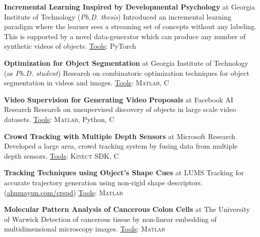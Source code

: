 \documentclass[10pt,twoside,a4paper]{article}
\newif\ifdetail
\newcommand\CPP{C\nolinebreak[4]\hspace{-.05em}\raisebox{.4ex}{\relsize{-3}{\textbf{++}}}}
\begin{document}
\textbf{Incremental Learning Inspired by Developmental Psychology} at Georgia Institute of Technology (\textit{Ph.D. thesis}) \newline
Introduced an incremental learning paradigm where the learner sees a streaming set of concepts without any labeling. This is supported by a novel data-generator which can produce any number of synthetic videos of objects. \underline{Tools}: PyTorch

\textbf{Optimization for Object Segmentation} at Georgia Institute of Technology (as \textit{Ph.D. student}) \newline
Research on combinatoric optimization techniques for object segmentation in videos and images. \underline{Tools}: \textsc{Matlab}, \CPP

\textbf{Video Supervision for Generating Video Proposals} at Facebook AI Research \newline
Research on unsupervised discovery of objects in large scale video datasets. \underline{Tools}: \textsc{Matlab}, Python, \CPP

\ifdetail
\textbf{Object Proposals for CT Images} at Georgia Institute of Technology (as \textit{Ph.D. student}) \newline
Supervising a project for generating segmentation proposals in 3D CT scans, leading to detection of organs.
\fi

\textbf{Crowd Tracking with Multiple Depth Sensors} at Microsoft Research \newline
Developed a large area, crowd tracking system by fusing data from multiple depth sensors. \underline{Tools}: \textsc{Kinect SDK}, \CPP

\ifdetail
\textbf{Detecting Occluded Regions} at UCL (\textit{MSc. thesis})\newline
Worked on a supervised learning method to detect regions of occlusion in a two frame sequence. \underline{Tools}: \textsc{Matlab}
\fi

\textbf{Tracking Techniques using Object's Shape Cues} at LUMS \newline
\ifdetail Researched tracking techniques for accurate generation of trajectories using object's non-rigid shape descriptors, resilient to occlusion. This was partly funded by NSF. \else Tracking for accurate trajectory generation using non-rigid shape descriptors. \fi (\href{http://ahumayun.com/crspd.html}{ahumayun.com/crspd}) \underline{Tools}: \textsc{Matlab}

\textbf{Molecular Pattern Analysis of Cancerous Colon Cells} at The University of Warwick \newline
\ifdetail A multi-disciplinary project for the detection of cancerous tissue. We developed registration and non-linear embedding techniques for analysis of tissues from a multidimensional imaging process. \else Detection of cancerous tissue by non-linear embedding of multidimensional microscopy images. \fi \underline{Tools}: \textsc{Matlab}
\end{document}
